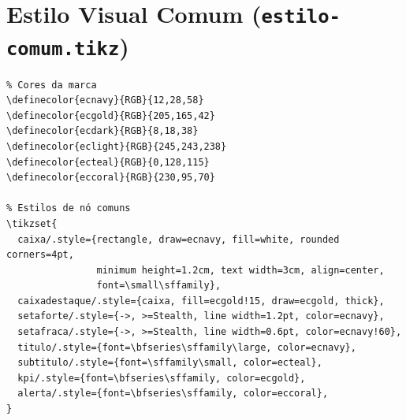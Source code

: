 \section*{Estilo Visual Comum (\texttt{estilo-comum.tikz})}
\begin{verbatim}
% Cores da marca
\definecolor{ecnavy}{RGB}{12,28,58}
\definecolor{ecgold}{RGB}{205,165,42}
\definecolor{ecdark}{RGB}{8,18,38}
\definecolor{eclight}{RGB}{245,243,238}
\definecolor{ecteal}{RGB}{0,128,115}
\definecolor{eccoral}{RGB}{230,95,70}

% Estilos de nó comuns
\tikzset{
  caixa/.style={rectangle, draw=ecnavy, fill=white, rounded corners=4pt, 
                minimum height=1.2cm, text width=3cm, align=center, 
                font=\small\sffamily},
  caixadestaque/.style={caixa, fill=ecgold!15, draw=ecgold, thick},
  setaforte/.style={->, >=Stealth, line width=1.2pt, color=ecnavy},
  setafraca/.style={->, >=Stealth, line width=0.6pt, color=ecnavy!60},
  titulo/.style={font=\bfseries\sffamily\large, color=ecnavy},
  subtitulo/.style={font=\sffamily\small, color=ecteal},
  kpi/.style={font=\bfseries\sffamily, color=ecgold},
  alerta/.style={font=\bfseries\sffamily, color=eccoral},
}
\end{verbatim}
